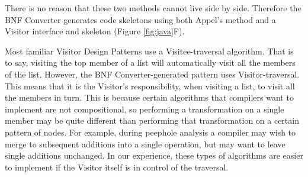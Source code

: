 There is no reason that these two methods cannot live side by side. Therefore the BNF Converter generates code skeletons using both Appel's method and a Visitor interface and skeleton (Figure \ref{fig:java}F).

Most familiar Visitor Design Patterns use a Visitee-traversal algorithm. That is to say, visiting the top member of a list will automatically visit all the members of the list. However, the BNF Converter-generated pattern uses Visitor-traversal. This means that it is the Visitor's responsibility, when visiting a list, to visit all the members in turn. This is because certain algorithms that compilers want to implement are not compositional, so performing a transformation on a single member may be quite different than performing that transformation on a certain pattern of nodes. For example, during peephole analysis a compiler may wish to merge to subsequent additions into a single operation, but may want to leave single additions unchanged. In our experience, these types of algorithms are easier to implement if the Visitor itself is in control of the traversal.

